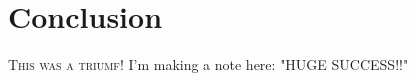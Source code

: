 \chapter{Conclusion}
\lettrine[lines=4, loversize=-0.1, lraise=0.1]{T}{his was a triumf!} I'm making a note here: "HUGE SUCCESS!!"